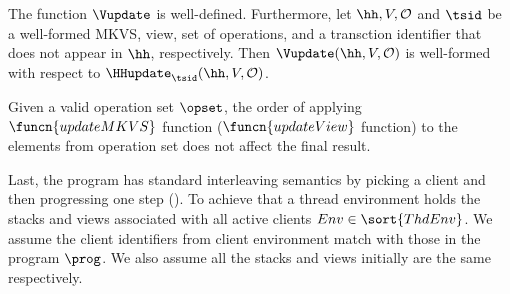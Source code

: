 \begin{lemma}
The function $\Vupdate$ is well-defined. Furthermore, let $\hh, V, \mathcal{O}$ and $\tsid$ 
be a well-formed MKVS, view, set of operations, and a transction identifier that does not appear 
in $\hh$, respectively. Then $\Vupdate(\hh, V, \mathcal{O})$ is well-formed with respect 
to $\HHupdate_{\tsid}(\hh, V, \mathcal{O})$.
\end{lemma}

\begin{lem}
Given a valid operation set \( \opset \), the order of applying \( \funcn{updateMKVS} \) function (\( \funcn{updateView} \) function) to the elements from operation set does not affect the final result.
\end{lem}
                                                                                                         
Last, the program has standard interleaving semantics by picking a client and then progressing one step ().
To achieve that a thread environment holds the stacks and views associated with all active clients \( Env \in \sort{ThdEnv} \).
We assume the client identifiers from client environment match with those in the program \( \prog \).
We also assume all the stacks and views initially are the same respectively.
